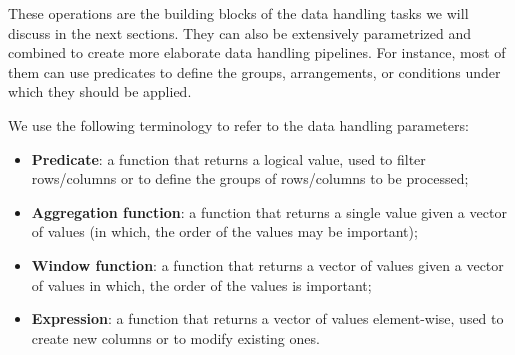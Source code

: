 
These operations are the building blocks of the data handling tasks we will discuss in the
next sections.  They can also be extensively parametrized and combined to create more
elaborate data handling pipelines.  For instance, most of them can use predicates to
define the groups, arrangements, or conditions under which they should be applied.

We use the following terminology to refer to the data handling parameters:
\begin{itemize}
  \item \textbf{Predicate}: a function that returns a logical value, used to filter
    rows/columns or to define the groups of rows/columns to be processed;
  \item \textbf{Aggregation function}: a function that returns a single value given a vector
    of values (in which, the order of the values may be important);
  \item \textbf{Window function}: a function that returns a vector of values given a vector
    of values in which, the order of the values is important;
  \item \textbf{Expression}: a function that returns a vector of values element-wise, used to create new
    columns or to modify existing ones.
\end{itemize}


